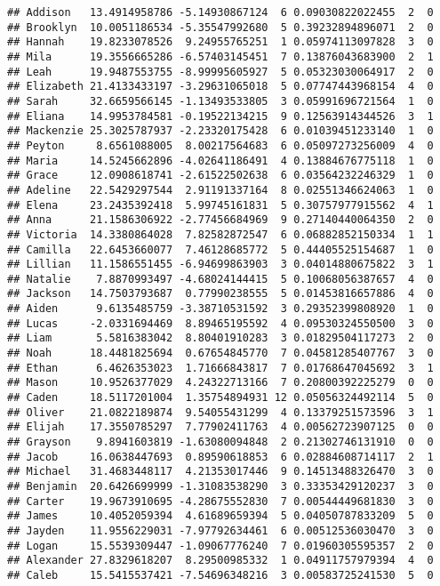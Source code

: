 \documentclass[
]{article}
\begin{document}
\begin{verbatim}
## Addison   13.4914958786 -5.14930867124  6 0.09030822022455  2  0
## Brooklyn  10.0051186534 -5.35547992680  5 0.39232894896071  2  0
## Hannah    19.8233078526  9.24955765251  1 0.05974113097828  3  0
## Mila      19.3556665286 -6.57403145451  7 0.13876043683900  2  1
## Leah      19.9487553755 -8.99995605927  5 0.05323030064917  2  0
## Elizabeth 21.4133433197 -3.29631065018  5 0.07747443968154  4  0
## Sarah     32.6659566145 -1.13493533805  3 0.05991696721564  1  0
## Eliana    14.9953784581 -0.19522134215  9 0.12563914344526  3  1
## Mackenzie 25.3025787937 -2.23320175428  6 0.01039451233140  1  0
## Peyton     8.6561088005  8.00217564683  6 0.05097273256009  4  0
## Maria     14.5245662896 -4.02641186491  4 0.13884676775118  1  0
## Grace     12.0908618741 -2.61522502638  6 0.03564232246329  1  0
## Adeline   22.5429297544  2.91191337164  8 0.02551346624063  1  0
## Elena     23.2435392418  5.99745161831  5 0.30757977915562  4  1
## Anna      21.1586306922 -2.77456684969  9 0.27140440064350  2  0
## Victoria  14.3380864028  7.82582872547  6 0.06882852150334  1  1
## Camilla   22.6453660077  7.46128685772  5 0.44405525154687  1  0
## Lillian   11.1586551455 -6.94699863903  3 0.04014880675822  3  1
## Natalie    7.8870993497 -4.68024144415  5 0.10068056387657  4  0
## Jackson   14.7503793687  0.77990238555  5 0.01453816657886  4  0
## Aiden      9.6135485759 -3.38710531592  3 0.29352399808920  1  0
## Lucas     -2.0331694469  8.89465195592  4 0.09530324550500  3  0
## Liam       5.5816383042  8.80401910283  3 0.01829504117273  2  0
## Noah      18.4481825694  0.67654845770  7 0.04581285407767  3  0
## Ethan      6.4626353023  1.71666843817  7 0.01768647045692  3  1
## Mason     10.9526377029  4.24322713166  7 0.20800392225279  0  0
## Caden     18.5117201004  1.35754894931 12 0.05056324492114  5  0
## Oliver    21.0822189874  9.54055431299  4 0.13379251573596  3  1
## Elijah    17.3550785297  7.77902411763  4 0.00562723907125  0  0
## Grayson    9.8941603819 -1.63080094848  2 0.21302746131910  0  0
## Jacob     16.0638447693  0.89590618853  6 0.02884608714117  2  1
## Michael   31.4683448117  4.21353017446  9 0.14513488326470  3  0
## Benjamin  20.6426699999 -1.31083538290  3 0.33353429120237  3  0
## Carter    19.9673910695 -4.28675552830  7 0.00544449681830  3  0
## James     10.4052059394  4.61689659394  5 0.04050787833209  5  0
## Jayden    11.9556229031 -7.97792634461  6 0.00512536030470  3  0
## Logan     15.5539309447 -1.09067776240  7 0.01960305595357  2  0
## Alexander 27.8329618207  8.29500985332  1 0.04911757979394  4  0
## Caleb     15.5415537421 -7.54696348216  3 0.00583725241530  5  0

\end{verbatim}
\end{document}
